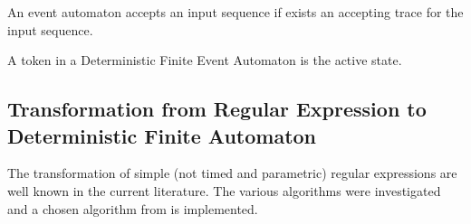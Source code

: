 		\begin{dfn}
			\label{dfn:cep:nea:accepting}
			An event automaton accepts an input sequence if exists an accepting trace for the input sequence.
		\end{dfn}
		
		\begin{dfn}
			\label{dfn:cep:nea:token}
			A token in a Deterministic Finite Event Automaton is the active state.
		\end{dfn}
		
		\subsection{Transformation from Regular Expression to Deterministic Finite Automaton}
			The transformation of simple (not timed and parametric) regular expressions are well known in the current literature. The various algorithms were investigated and a chosen algorithm from \citep{lam2006compilers} is implemented.
	
			
